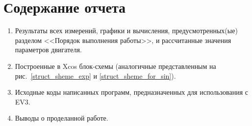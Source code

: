 \documentclass[12pt, a4paper, openany]{extarticle}
\begin{document}
\newpage
\section{Содержание отчета}
\begin{enumerate}
\item Результаты всех измерений, графики и вычисления, предусмотренных(ые) разделом <<Порядок выполнения работы>>, и рассчитанные значения параметров двигателя.
\item Построенные в Xcos блок-схемы (аналогичные представленным на рис.~\ref{struct_sheme_exp} и \ref{struct_sheme_for_sin}).
\item Исходные коды написанных программ, предназначенных для использования с EV3.
\item Выводы о проделанной работе.
\end{enumerate}
\end{document}

